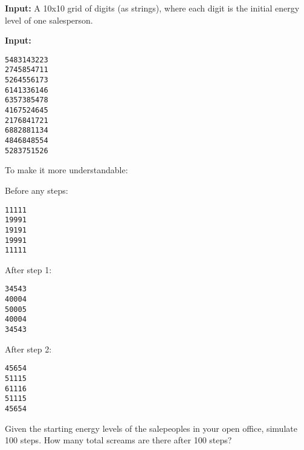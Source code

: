 \documentclass[12pt,a4paper]{article}
\begin{document}
\textbf{Input:} A 10x10 grid of digits (as strings), where each digit is the initial energy level of one salesperson.

\textbf{Input:}
\begin{lstlisting}
5483143223
2745854711
5264556173
6141336146
6357385478
4167524645
2176841721
6882881134
4846848554
5283751526
\end{lstlisting}

To make it more understandable:

Before any steps:
\begin{lstlisting}
11111
19991
19191
19991
11111
\end{lstlisting}

After step 1:
\begin{lstlisting}
34543
40004
50005
40004
34543
\end{lstlisting}

After step 2:
\begin{lstlisting}
45654
51115
61116
51115
45654
\end{lstlisting}

Given the starting energy levels of the salepeoples in your open office, simulate 100 steps. How many total screams are there after 100 steps?
\end{document}
